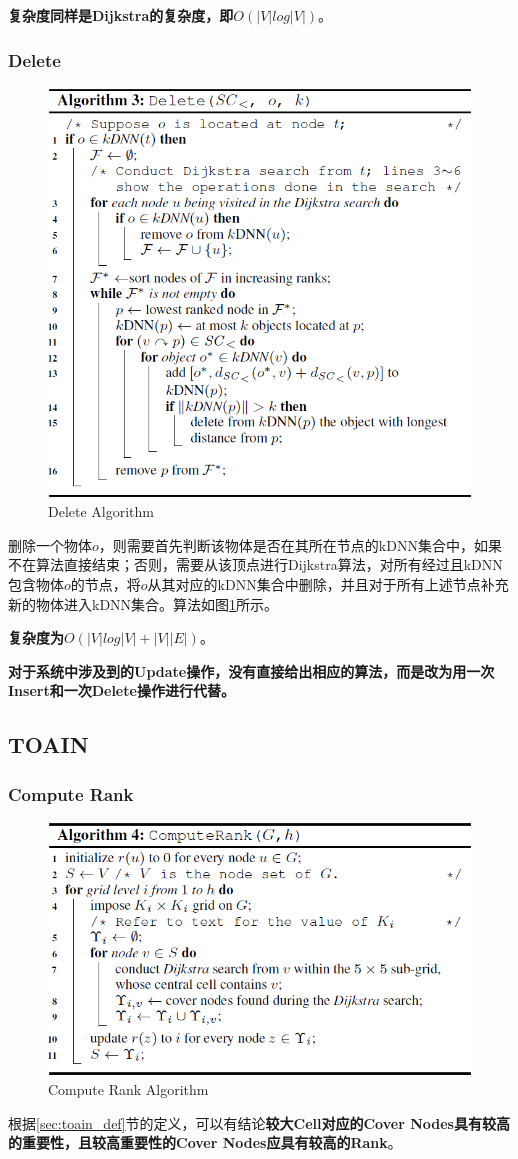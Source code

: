 \documentclass{ML}
\begin{document}
\textbf{复杂度同样是Dijkstra的复杂度，即$O(|V|log|V|)$}。
\subsubsection{Delete}
\begin{figure}[htb]
	\centering
	\includegraphics[width=0.6\linewidth]{media/delete.png}
	\caption{Delete Algorithm}\label{fig:delete}
\end{figure}
删除一个物体$o$，则需要首先判断该物体是否在其所在节点的kDNN集合中，如果不在算法直接结束；否则，需要从该顶点进行Dijkstra算法，对所有经过且kDNN包含物体$o$的节点，将$o$从其对应的kDNN集合中删除，并且对于所有上述节点补充新的物体进入kDNN集合。算法如图\ref{fig:delete}所示。

\textbf{复杂度为$O(|V|log|V| + |V||E|)$}。

\textbf{对于系统中涉及到的Update操作，没有直接给出相应的算法，而是改为用一次Insert和一次Delete操作进行代替。}
\subsection{TOAIN}\label{sec:toain_compute_rank}
\subsubsection{Compute Rank}
\begin{figure}[htb]
	\centering
	\includegraphics[width=0.6\linewidth]{media/compute_rank.png}
	\caption{Compute Rank Algorithm}\label{fig:compute_rank}
\end{figure}
根据\ref{sec:toain_def}节的定义，可以有结论\textbf{较大Cell对应的Cover Nodes具有较高的重要性，且较高重要性的Cover Nodes应具有较高的Rank}。
\end{document}
